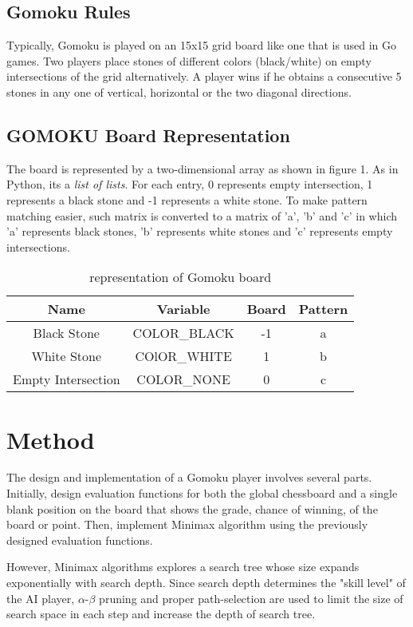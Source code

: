 \documentclass[conference]{IEEEtran}
\begin{document}
  \subsection{Gomoku Rules}
  Typically, Gomoku is played on an 15x15 grid board like one that is used in Go games. Two players place stones of different colors (black/white) on empty intersections of the grid alternatively. A player wins if he obtains a consecutive 5 stones in any one of vertical, horizontal or the two diagonal directions.  
  \subsection{GOMOKU Board Representation}
  The board is represented by a two-dimensional array as shown in figure 1. As in Python, its a \emph{list of lists}. For each entry, 0 represents empty intersection, 1 represents a black stone and -1 represents a white stone. To make pattern matching easier, such matrix is converted to a matrix of 'a', 'b' and 'c' in which 'a' represents black stones, 'b' represents white stones and 'c' represents empty intersections.
    
	\begin{table}[htb]
	\caption{representation of Gomoku board}
	\centering
    \begin{tabular}{cccc}
    \toprule
    Name&Variable&Board&Pattern\\
    \midrule
    Black Stone&COLOR\_BLACK&-1&a\\
    White Stone&COlOR\_WHITE&1&b\\
    Empty Intersection&COLOR\_NONE&0&c\\
	\bottomrule
	\end{tabular}
	\label{table:1}
	\end{table}
  
\section{Method}
The design and implementation of a Gomoku player involves several parts. Initially, design evaluation functions for both the global chessboard and a single blank position on the board that shows the grade, chance of winning, of the board or point. Then, implement Minimax algorithm using the previously designed evaluation functions.

However, Minimax algorithms explores a search tree whose size expands exponentially with search depth. Since search depth determines the "skill level" of the AI player, $\alpha$-$\beta$ pruning and proper path-selection are used to limit the size of search space in each step and increase the depth of search tree.
\end{document}
